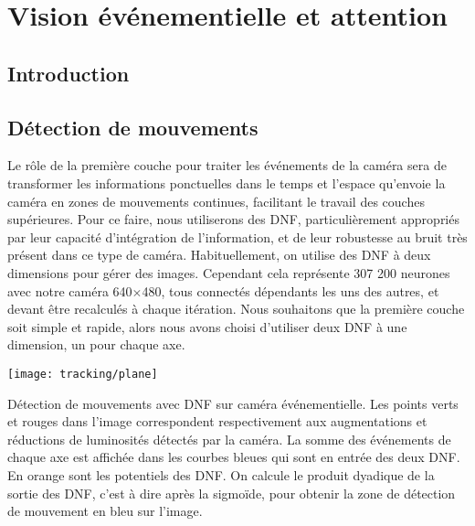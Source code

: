 
\chapter{Vision événementielle et attention}
	\minitoc
	\newpage




	\section{Introduction}
	\section{Détection de mouvements}

	Le rôle de la première couche pour traiter les événements de la caméra sera de transformer les informations ponctuelles dans le temps et l'espace qu'envoie la caméra en zones de mouvements continues, facilitant le travail des couches supérieures. Pour ce faire, nous utiliserons des DNF, particulièrement appropriés par leur capacité d'intégration de l'information, et de leur robustesse au bruit très présent dans ce type de caméra. Habituellement, on utilise des DNF à deux dimensions pour gérer des images. Cependant cela représente 307 200 neurones avec notre caméra 640$\times$480, tous connectés dépendants les uns des autres, et devant être recalculés à chaque itération. Nous souhaitons que la première couche soit simple et rapide, alors nous avons choisi d'utiliser deux DNF à une dimension, un pour chaque axe.

	\begin{figureth}
		\begin{subfigureth}{\textwidth}
			\texttt{[image: tracking/plane]}
		\end{subfigureth}
		\caption[Détection de mouvements avec DNF sur caméra événementielle]{Détection de mouvements avec DNF sur caméra événementielle. Les points verts et rouges dans l'image correspondent respectivement aux augmentations et réductions de luminosités détectés par la caméra. La somme des événements de chaque axe est affichée dans les courbes bleues qui sont en entrée des deux DNF. En orange sont les potentiels des DNF. On calcule le produit dyadique de la sortie des DNF, c'est à dire après la sigmoïde, pour obtenir la zone de détection de mouvement en bleu sur l'image.}\label{fig:track:plane}
	\end{figureth}

